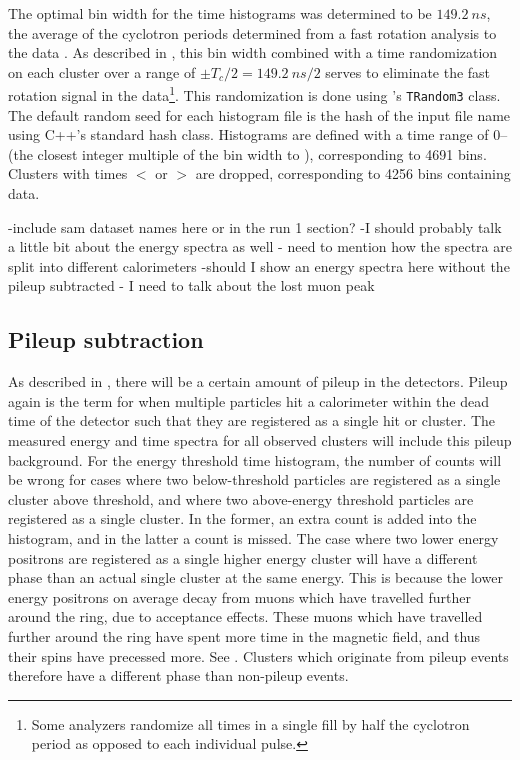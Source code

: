The optimal bin width for the time histograms was determined to be $\SI{149.2}{ns}$, the average of the cyclotron periods determined from a fast rotation analysis to the data \cite{fastrotationsomething}. As described in , this bin width combined with a time randomization on each cluster over a range of $\pm T_{c}/2 = \SI{149.2}{ns} / 2$ serves to eliminate the fast rotation signal in the data\footnote{Some analyzers randomize all times in a single fill by half the cyclotron period as opposed to each individual pulse.}. This randomization is done using \ROOT's \texttt{TRandom3} class. The default random seed for each histogram \ROOT file is the hash of the input file name using C++'s standard hash class. Histograms are defined with a time range of 0-- (the closest integer multiple of the bin width to ), corresponding to 4691 bins. Clusters with times $<$  or $>$  are dropped, corresponding to 4256 bins containing data.




-include sam dataset names here or in the run 1 section?
-I should probably talk a little bit about the energy spectra as well
- need to mention how the spectra are split into different calorimeters
-should I show an energy spectra here without the pileup subtracted - I need to talk about the lost muon peak 


\subsection{Pileup subtraction}
\label{sub:pileupsubtraction}


As described in , there will be a certain amount of pileup in the detectors. Pileup again is the term for when multiple particles hit a calorimeter within the dead time of the detector such that they are registered as a single hit or cluster. The measured energy and time spectra for all observed clusters will include this pileup background. For the energy threshold time histogram, the number of counts will be wrong for cases where two below-threshold particles are registered as a single cluster above threshold, and where two above-energy threshold particles are registered as a single cluster. In the former, an extra count is added into the histogram, and in the latter a count is missed. The case where two lower energy positrons are registered as a single higher energy cluster will have a different \gmtwo phase than an actual single cluster at the same energy. This is because the lower energy positrons on average decay from muons which have travelled further around the ring, due to acceptance effects. These muons which have travelled further around the ring have spent more time in the magnetic field, and thus their spins have precessed more. See . Clusters which originate from pileup events therefore have a different \gmtwo phase than non-pileup events. 


